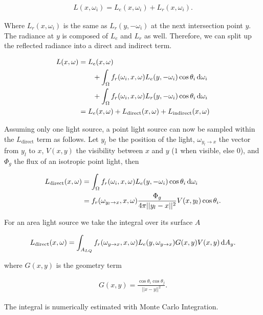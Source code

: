 \begin{align}
L(x, \omega_i) = L_e(x, \omega_i) + L_r(x, \omega_i).
\end{align}

Where $L_r(x, \omega_i)$ is the same as $L_r(y, -\omega_i)$ at the next intersection point $y$. The radiance at $y$ is composed of $L_e$ and $L_r$ as well. Therefore, we can split up the reflected radiance into a direct and indirect term.

\begin{align}
L(x, \omega) &= L_e(x, \omega) \\
& \qquad + \int_{\Omega}f_r(\omega_i, x, \omega) L_e(y, -\omega_i)\cos\theta_i \mathop{}\!\mathrm{d}\omega_i \\
& \qquad + \int_{\Omega}f_r(\omega_i, x, \omega) L_r(y, -\omega_i)\cos\theta_i \mathop{}\!\mathrm{d}\omega_i \\
&= L_e(x,\omega) + L_{\text{direct}}(x, \omega) + L_{\text{indirect}}(x,\omega) \label{eq:reqsplit}
\end{align}

Assuming only one light source, a point light source can now be sampled within the $L_{\text{direct}}$ term as follows. Let $y_l$ be the position of the light, $\omega_{y_l\rightarrow x}$ the vector from $y_l$ to $x$, $V(x,y)$ the visibility between $x$ and $y$ ($1$ when visible, else $0$), and $\Phi_g$ the flux of an isotropic point light, then 

\begin{align}
L_{\text{direct}}(x, \omega) &= \int_{\Omega}f_r(\omega_i, x, \omega) L_e(y, -\omega_i)\cos\theta_i \mathop{}\!\mathrm{d}\omega_i \\
&= f_r(\omega_{y_l\rightarrow x}, x, \omega) \frac{\Phi_g}{4\pi||y_l-x||^2} V(x, y_l) \cos\theta_i.
\end{align}

For an area light source we take the integral over its surface $A$

\begin{align}
L_{\text{direct}}(x, \omega) = \int_{A_{LQ}}f_r(\omega_{y \rightarrow x}, x, \omega) L_e(y, \omega_{y \rightarrow x}) G(x,y)V(x,y) \mathop{}\!\mathrm{d} A_y.
\end{align}

where $G(x, y)$ is the geometry term

\begin{align}
G(x,y) = \frac{\cos\theta_i\cos\theta_j}{||x-y||^2}.
\end{align}

The integral is numerically estimated with Monte Carlo Integration.

